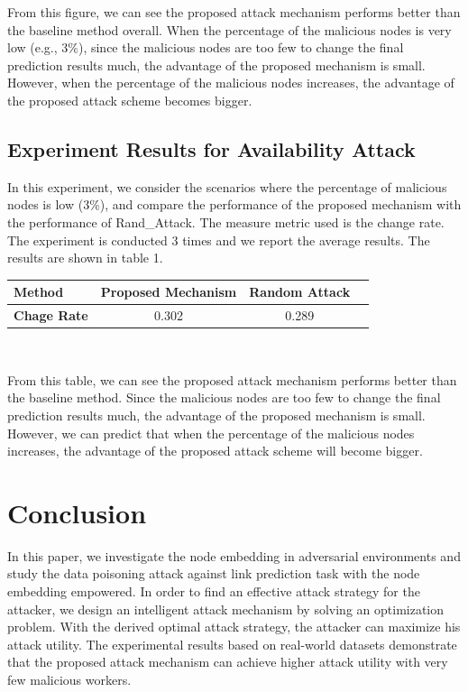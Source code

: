 \documentclass{acmtog} %
\begin{document}
%
\indent From this figure, we can see the proposed attack mechanism performs better than the baseline method overall. When the percentage of the malicious nodes is very low (e.g., 3$\%$), since the malicious nodes are too few to change the final prediction results much, the advantage of the proposed mechanism is small. However, when the percentage of the malicious nodes increases, the advantage of the proposed attack scheme becomes bigger. 
\subsection{Experiment Results for Availability Attack}
In this experiment, we consider the scenarios where the percentage of malicious nodes is low (3\%), and compare the performance of the proposed mechanism with the performance of Rand\_Attack. The measure metric used is the change rate. The experiment is conducted 3 times and we report the average results. The results are shown in table 1.
\begin{table}[h]
\centering
\begin{tabular}{p{2.5cm}|ccc}
	\hline 
	\textbf{Method}& Proposed Mechanism& Random Attack\\
	\hline  
	\textbf{Chage Rate}& 0.302& 0.289\\
	\hline
\end{tabular}
\\
\end{table}

\indent From this table, we can see the proposed attack mechanism performs better than the baseline method. Since the malicious nodes are too few to change the final prediction results much, the advantage of the proposed mechanism is small. However, we can predict that when the percentage of the malicious nodes increases, the advantage of the proposed attack scheme will become bigger. 

\section{Conclusion}
\label{sec:conclusion}
%
In this paper, we investigate the node embedding in adversarial environments and study the data poisoning attack against link prediction task with the node embedding empowered. In order to find an effective attack strategy for the attacker, we design an intelligent attack mechanism by solving an optimization problem. With the derived optimal attack strategy, the attacker can maximize his attack utility. The experimental results based on real-world datasets demonstrate that the proposed attack mechanism can achieve higher attack utility with very few malicious workers.





\end{document}
